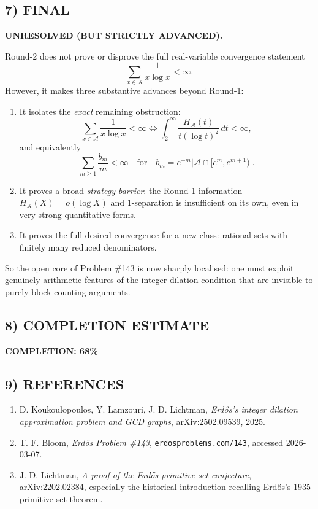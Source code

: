 \subsection*{7) FINAL}

\textbf{UNRESOLVED (BUT STRICTLY ADVANCED).}

Round-2 does not prove or disprove the full real-variable convergence statement
\[
\sum_{x\in\mathcal A}\frac{1}{x\log x}<\infty.
\]
However, it makes three substantive advances beyond Round-1:

\begin{enumerate}
\item It isolates the \emph{exact} remaining obstruction:
\[
\sum_{x\in\mathcal A}\frac{1}{x\log x}<\infty
\iff
\int_2^\infty \frac{H_{\mathcal A}(t)}{t(\log t)^2}\,dt<\infty,
\]
and equivalently
\[
\sum_{m\ge 1}\frac{b_m}{m}<\infty
\quad\text{for}\quad
b_m=e^{-m}\bigl|\mathcal A\cap[e^m,e^{m+1})\bigr|.
\]
\item It proves a broad \emph{strategy barrier}: the Round-1 information
$H_{\mathcal A}(X)=o(\log X)$ and $1$-separation is insufficient on its own, even in very strong
quantitative forms.
\item It proves the full desired convergence for a new class: rational sets with finitely many reduced
denominators.
\end{enumerate}

So the open core of Problem \#143 is now sharply localised: one must exploit genuinely arithmetic
features of the integer-dilation condition that are invisible to purely block-counting arguments.

\subsection*{8) COMPLETION ESTIMATE}

\textbf{COMPLETION: 68\%}

\subsection*{9) REFERENCES}

\begin{enumerate}
\item D. Koukoulopoulos, Y. Lamzouri, J. D. Lichtman, \emph{Erd\H{o}s's integer dilation approximation problem and GCD graphs}, arXiv:2502.09539, 2025.
\item T. F. Bloom, \emph{Erd\H{o}s Problem \#143}, \texttt{erdosproblems.com/143}, accessed 2026-03-07.
\item J. D. Lichtman, \emph{A proof of the Erd\H{o}s primitive set conjecture}, arXiv:2202.02384, especially the historical introduction recalling Erd\H{o}s's 1935 primitive-set theorem.
\end{enumerate}

\newpage
